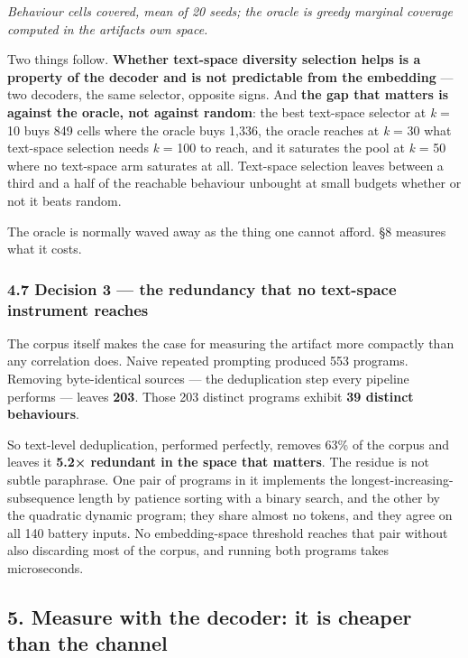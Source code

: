 \documentclass[
  10pt,
]{article}
\theoremstyle{plain}
\theoremstyle{definition}
\begin{document}
\emph{Behaviour cells covered, mean of 20 seeds; the oracle is greedy
marginal coverage computed in the artifact\textquotesingle s own space.}

Two things follow. \textbf{Whether text-space diversity selection helps
is a property of the decoder and is not predictable from the embedding}
--- two decoders, the same selector, opposite signs. And \textbf{the gap
that matters is against the oracle, not against random}: the best
text-space selector at \emph{k} = 10 buys 849 cells where the oracle
buys 1,336, the oracle reaches at \emph{k} = 30 what text-space
selection needs \emph{k} = 100 to reach, and it saturates the pool at
\emph{k} = 50 where no text-space arm saturates at all. Text-space
selection leaves between a third and a half of the reachable behaviour
unbought at small budgets whether or not it beats random.

The oracle is normally waved away as the thing one cannot afford. §8
measures what it costs.

\subsubsection{4.7 Decision 3 --- the redundancy that no text-space
instrument
reaches}\label{47-decision-3--the-redundancy-that-no-text-space-instrument-reaches}

The corpus itself makes the case for measuring the artifact more
compactly than any correlation does. Naive repeated prompting produced
553 programs. Removing byte-identical sources --- the deduplication step
every pipeline performs --- leaves \textbf{203}. Those 203 distinct
programs exhibit \textbf{39 distinct behaviours}.

So text-level deduplication, performed perfectly, removes 63\% of the
corpus and leaves it \textbf{5.2× redundant in the space that matters}.
The residue is not subtle paraphrase. One pair of programs in it
implements the longest-increasing- subsequence length by patience
sorting with a binary search, and the other by the quadratic dynamic
program; they share almost no tokens, and they agree on all 140 battery
inputs. No embedding-space threshold reaches that pair without also
discarding most of the corpus, and running both programs takes
microseconds.

\subsection{5. Measure with the decoder: it is cheaper than the
channel}\label{5-measure-with-the-decoder-it-is-cheaper-than-the-channel}
\end{document}
